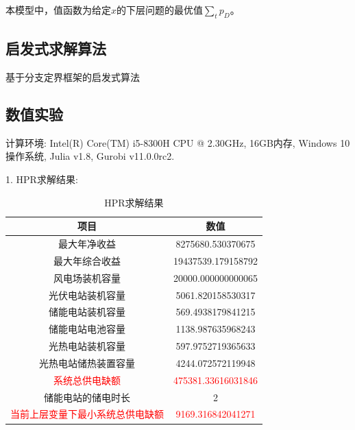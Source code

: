 \documentclass{article}
\begin{document}
本模型中，值函数为给定$x$的下层问题的最优值$\sum\limits_{t} p_D$。

\subsection{启发式求解算法}

\begin{algorithm}[H]
    \caption{基于分支定界框架的启发式算法}%
    \LinesNumbered %
\end{algorithm}

\clearpage
\subsection{数值实验}
计算环境: Intel(R) Core(TM) i5-8300H CPU @ 2.30GHz, 16GB内存, Windows 10操作系统, Julia v1.8, Gurobi v11.0.0rc2.

 1. HPR求解结果:
\begin{table}[H]
    \centering
    \caption{HPR求解结果}
    \label{tab:energy_system_data}
    \begin{tabular}{c|c}
        \toprule
        \textbf{项目} & \textbf{数值} \\
        \midrule
        最大年净收益 & 8275680.530370675 \\
        最大年综合收益 & 19437539.179158792 \\
        风电场装机容量 & 20000.000000000065 \\
        光伏电站装机容量 & 5061.820158530317 \\
        储能电站装机容量 & 569.4938179841215 \\
        储能电站电池容量 & 1138.987635968243 \\
        光热电站装机容量 & 597.9752719365633 \\
        光热电站储热装置容量 & 4244.072572119948 \\
        \textcolor{red}{系统总供电缺额} & \textcolor{red}{475381.33616031846} \\
        储能电站的储电时长 & 2 \\
        \textcolor{red}{当前上层变量下最小系统总供电缺额} & \textcolor{red}{9169.316842041271} \\
        \bottomrule
    \end{tabular}
\end{table}
\end{document}
